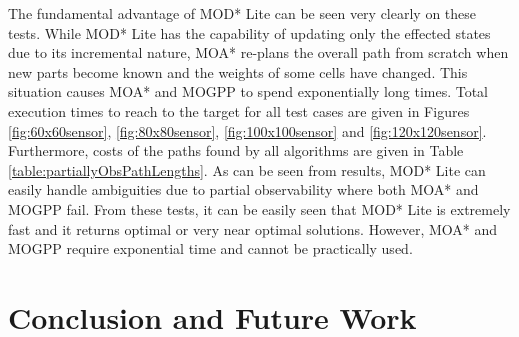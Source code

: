 \documentclass[10pt,journal]{IEEEtran}
\begin{document}
The fundamental advantage of MOD* Lite can be seen very clearly on these tests. While MOD* Lite has the capability of updating only the effected states due to its incremental nature, MOA* re-plans the overall path from scratch when new parts become known and the weights of some cells have changed. This situation causes MOA* and MOGPP to spend exponentially long times. Total execution times to reach to the target for all test cases are given in Figures \ref{fig:60x60sensor}, \ref{fig:80x80sensor}, \ref{fig:100x100sensor} and \ref{fig:120x120sensor}. Furthermore,  costs of the paths found by all algorithms are given in Table \ref{table:partiallyObsPathLengths}. As can be seen from results, MOD* Lite can easily handle ambiguities due to partial observability where both MOA* and MOGPP fail.  From these tests, it can be easily seen that MOD* Lite is extremely fast and it returns optimal or very near optimal solutions. However, MOA* and MOGPP require exponential time and cannot be practically used.


\section{Conclusion and Future Work}
\label{chapter:conclusion}

\end{document}
